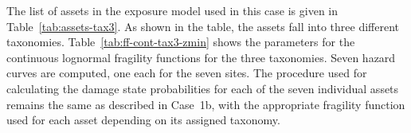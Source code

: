 The list of assets in the exposure model used in this case is given in Table~\ref{tab:assets-tax3}. As shown in the table, the assets fall into three different taxonomies. Table~\ref{tab:ff-cont-tax3-zmin} shows the parameters for the continuous lognormal fragility functions for the three taxonomies. Seven hazard curves are computed, one each for the seven sites. The procedure used for calculating the damage state probabilities for each of the seven individual assets remains the same as described in Case~1b, with the appropriate fragility function used for each asset depending on its assigned taxonomy.